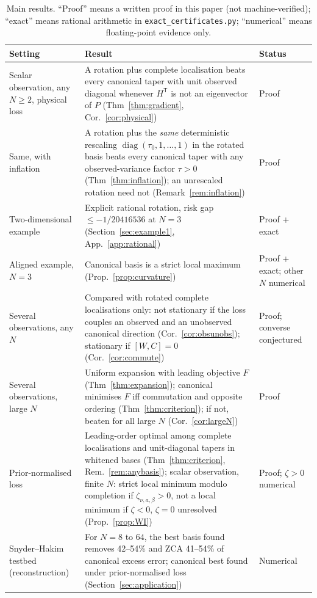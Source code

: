 \documentclass[11pt,a4paper]{article}
\numberwithin{equation}{section}
\theoremstyle{remark}\newtheorem{remark}[theorem]{Remark}
\newcommand{\diag}{\operatorname{diag}}
\newcommand{\T}{^{\mathsf T}}
\begin{document}
\begin{table}[ht]
\centering
\caption{Main results. ``Proof'' means a written proof in this paper (not machine-verified);
``exact'' means rational arithmetic in \texttt{exact\_certificates.py}; ``numerical'' means
floating-point evidence only.}
\label{tab:glance}
\small
\begin{tabularx}{\linewidth}{>{\raggedright\arraybackslash}p{3.6cm}>{\raggedright\arraybackslash}X>{\raggedright\arraybackslash}p{2.5cm}}
\toprule
Setting & Result & Status\\
\midrule
Scalar observation, any \(N\ge2\), physical loss
 & A rotation plus complete localisation beats every canonical taper with unit observed
   diagonal whenever \(H\T\) is not an eigenvector of \(P\) (Thm~\ref{thm:gradient},
   Cor.~\ref{cor:physical}) & Proof\\
Same, with inflation & A rotation plus the \emph{same} deterministic rescaling
   \(\diag(\tau_0,1,\ldots,1)\) in the rotated basis beats every canonical taper with any
   observed-variance factor \(\tau>0\) (Thm~\ref{thm:inflation}); an unrescaled rotation need
   not (Remark~\ref{rem:inflation}) & Proof\\
Two-dimensional example & Explicit rational rotation, risk gap \(\le-1/20416536\) at \(N=3\)
   (Section~\ref{sec:example1}, App.~\ref{app:rational}) & Proof + exact\\
Aligned example, \(N=3\) & Canonical basis is a strict local maximum
   (Prop.~\ref{prop:curvature}) & Proof + exact; other \(N\) numerical\\
Several observations, any \(N\)
 & Compared with rotated complete localisations only: not stationary if the loss couples an observed and an unobserved canonical direction
   (Cor.~\ref{cor:obsunobs}); stationary if \([W,C]=0\) (Cor.~\ref{cor:commute}) & Proof;
   converse conjectured\\
Several observations, large \(N\) & Uniform expansion with leading objective \(F\)
   (Thm~\ref{thm:expansion}); canonical minimises \(F\) iff commutation and opposite ordering
   (Thm~\ref{thm:criterion}); if not, beaten for all large \(N\)
   (Cor.~\ref{cor:largeN}) & Proof\\
Prior-normalised loss & Leading-order optimal among complete localisations and
   unit-diagonal tapers in whitened bases (Thm~\ref{thm:criterion}, Rem.~\ref{rem:anybasis});
   scalar observation, finite \(N\): strict local minimum modulo completion if
   \(\zeta_{\nu,a,\beta}>0\), not a local minimum if \(\zeta<0\), \(\zeta=0\) unresolved
   (Prop.~\ref{prop:WI}) & Proof; \(\zeta>0\) numerical\\
Snyder--Hakim testbed (reconstruction) & For \(N=8\) to \(64\), the best basis found removes
   42--54\% and ZCA 41--54\% of canonical excess error; canonical best found under
   prior-normalised loss
   (Section~\ref{sec:application}) & Numerical\\
\bottomrule
\end{tabularx}
\end{table}
\end{document}

